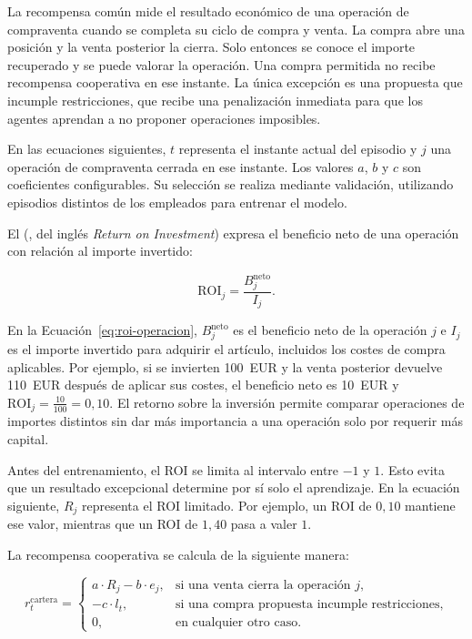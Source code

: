 La recompensa común mide el resultado económico de una operación de compraventa cuando se completa su ciclo de compra y venta. La compra abre una posición y la venta posterior la cierra. Solo entonces se conoce el importe recuperado y se puede valorar la operación. Una compra permitida no recibe recompensa cooperativa en ese instante. La única excepción es una propuesta que incumple restricciones, que recibe una penalización inmediata para que los agentes aprendan a no proponer operaciones imposibles.

En las ecuaciones siguientes, $t$ representa el instante actual del episodio y $j$ una operación de compraventa cerrada en ese instante. Los valores $a$, $b$ y $c$ son coeficientes configurables. Su selección se realiza mediante validación, utilizando episodios distintos de los empleados para entrenar el modelo.

El \textbf{} (, del inglés \textit{Return on Investment}) expresa el beneficio neto de una operación con relación al importe invertido:

\begin{equation}
\mathrm{ROI}_j=\frac{B^{\mathrm{neto}}_j}{I_j}.
\label{eq:roi-operacion}
\end{equation}

En la Ecuación~\ref{eq:roi-operacion}, $B^{\mathrm{neto}}_j$ es el beneficio neto de la operación $j$ e $I_j$ es el importe invertido para adquirir el artículo, incluidos los costes de compra aplicables. Por ejemplo, si se invierten 100~EUR y la venta posterior devuelve 110~EUR después de aplicar sus costes, el beneficio neto es 10~EUR y $\mathrm{ROI}_j=\frac{10}{100}=0{,}10$. El retorno sobre la inversión permite comparar operaciones de importes distintos sin dar más importancia a una operación solo por requerir más capital.

Antes del entrenamiento, el ROI se limita al intervalo entre $-1$ y $1$. Esto evita que un resultado excepcional determine por sí solo el aprendizaje. En la ecuación siguiente, $R_j$ representa el ROI limitado. Por ejemplo, un ROI de $0{,}10$ mantiene ese valor, mientras que un ROI de $1{,}40$ pasa a valer $1$.

La recompensa cooperativa se calcula de la siguiente manera:

\begin{equation}
r_t^{\mathrm{cartera}}=
\begin{cases}
a\cdot R_j-b\cdot e_j,
& \text{si una venta cierra la operación } j, \\
-c\cdot l_t,
& \text{si una compra propuesta incumple restricciones}, \\
0,
& \text{en cualquier otro caso}.
\end{cases}
\label{eq:recompensa-cooperativa}
\end{equation}

